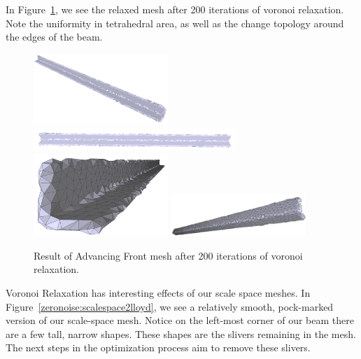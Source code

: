\documentclass[12pt]{drexelthesis}
\begin{document}
In Figure~\ref{zeronoise:advancedlloyd}, we see the relaxed mesh after 200 iterations of voronoi relaxation. Note the uniformity in tetrahedral area, as well as the change topology around the edges of the beam.

\begin{figure}[!ht]
	\centering
		\includegraphics[width=2in]{simulated-lab-scan/0noise/optimized/advancedfrontLloyd30s200it00.png}
		\includegraphics[width=3in]{simulated-lab-scan/0noise/optimized/advancedfrontLloyd30s200it01.png}
		\includegraphics[width=2in]{simulated-lab-scan/0noise/optimized/advancedfrontLloyd30s200it02.png}
		\includegraphics[width=2in]{simulated-lab-scan/0noise/optimized/advancedfrontLloyd30s200it03.png}
		\caption[Advancing Front mesh after 200 iterations of voronoi relaxation]{\centering  Result of Advancing Front mesh after 200 iterations of voronoi relaxation.}
	\label{zeronoise:advancedlloyd}
\end{figure}

Voronoi Relaxation has interesting effects of our scale space meshes. In Figure~\ref{zeronoise:scalespace2lloyd}, we see a relatively smooth, pock-marked version of our scale-space mesh. Notice on the left-most corner of our beam there are a few tall, narrow shapes. These shapes are the slivers remaining in the mesh. The next steps in the optimization process aim to remove these slivers.
\end{document}
